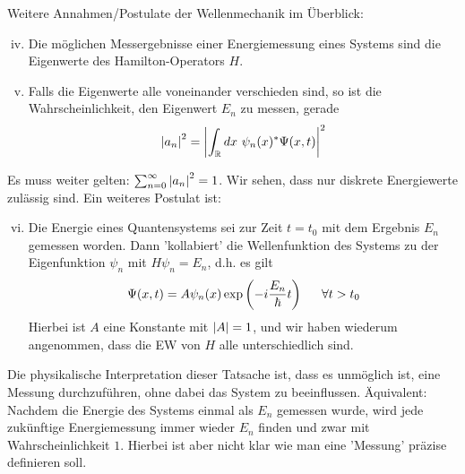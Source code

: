 Weitere Annahmen/Postulate der Wellenmechanik im Überblick:
\begin{enumerate}[(i)]
    \setcounter{enumi}{3}
    \item Die möglichen Messergebnisse einer Energiemessung eines Systems
        sind die Eigenwerte des Hamilton-Operators $H$.
    \item Falls die Eigenwerte alle voneinander verschieden sind, so ist die
        Wahrscheinlichkeit, den Eigenwert $E_n$ zu messen, gerade
        \begin{align*}
            \left\vert a_n \right\vert^2 = \left\vert \int_{\mathbb{R}} dx \ \psi_n (x)^\ast \Psi(x,t) \right\vert^2
        \end{align*}
\end{enumerate}
Es muss weiter gelten: $\sum_{n=0}^\infty \left\vert a_n \right\vert^2 = 1$. Wir sehen, dass
nur diskrete Energiewerte zulässig sind. Ein weiteres Postulat ist:
\begin{enumerate}[(i)]
    \setcounter{enumi}{5}
    \item Die Energie eines Quantensystems sei zur Zeit $t=t_0$ mit dem
        Ergebnis $E_n$ gemessen worden. Dann 'kollabiert' die Wellenfunktion
        des Systems zu der Eigenfunktion $\psi_n$ mit $H \psi_n = E_n$, d.h.
        es gilt
        \begin{align*}
            \Psi(x,t) = A \psi_n (x) \exp \left( -i \frac{E_n}{\hbar} t \right)
            \hspace{15pt} \forall t > t_0
        \end{align*}
        Hierbei ist $A$ eine Konstante mit $\left\vert A \right\vert = 1$, und wir haben
        wiederum angenommen, dass die EW von $H$ alle unterschiedlich sind.
\end{enumerate}
Die physikalische Interpretation dieser Tatsache ist, dass es unmöglich ist,
eine Messung durchzuführen, ohne dabei das System zu beeinflussen. Äquivalent:
Nachdem die Energie des Systems einmal als $E_n$ gemessen wurde, wird jede
zukünftige Energiemessung immer wieder $E_n$ finden und zwar mit
Wahrscheinlichkeit $1$. Hierbei ist aber nicht klar wie man eine 'Messung'
präzise definieren soll.